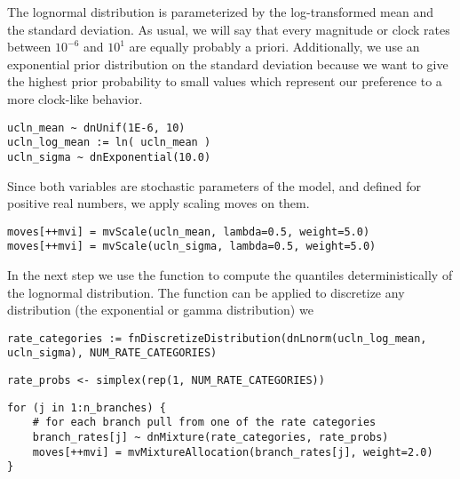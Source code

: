 The lognormal distribution is parameterized by the log-transformed mean and the standard deviation.
As usual, we will say that every magnitude or clock rates between $10^{-6}$ and $10^{1}$ are equally probably a priori.
Additionally, we use an exponential prior distribution on the standard deviation because we want to give the highest prior probability to small values which represent our preference to a more clock-like behavior.
{\tt \begin{snugshade*}
\begin{lstlisting}
ucln_mean ~ dnUnif(1E-6, 10)
ucln_log_mean := ln( ucln_mean )
ucln_sigma ~ dnExponential(10.0)
\end{lstlisting}
\end{snugshade*}}
Since both variables are stochastic parameters of the model, and defined for positive real numbers, we apply scaling moves on them.
{\tt \begin{snugshade*}
\begin{lstlisting}moves[++mvi] = mvScale(ucln_mean, lambda=0.5, weight=5.0)
moves[++mvi] = mvScale(ucln_sigma, lambda=0.5, weight=5.0)
\end{lstlisting}
\end{snugshade*}}
In the next step we use the function  to compute the quantiles deterministically of the lognormal distribution.
The  function can be applied to discretize any distribution (\EG the exponential or gamma distribution) we
{\tt \begin{snugshade*}
\begin{lstlisting}
rate_categories := fnDiscretizeDistribution(dnLnorm(ucln_log_mean, ucln_sigma), NUM_RATE_CATEGORIES)
\end{lstlisting}
\end{snugshade*}}

{\tt \begin{snugshade*}
\begin{lstlisting}
rate_probs <- simplex(rep(1, NUM_RATE_CATEGORIES))
\end{lstlisting}
\end{snugshade*}}

{\tt \begin{snugshade*}
\begin{lstlisting}
for (j in 1:n_branches) {
    # for each branch pull from one of the rate categories
    branch_rates[j] ~ dnMixture(rate_categories, rate_probs)
    moves[++mvi] = mvMixtureAllocation(branch_rates[j], weight=2.0)
}
\end{lstlisting}
\end{snugshade*}}

